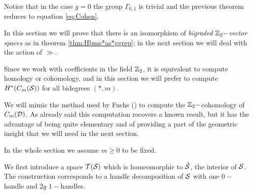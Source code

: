 Notice that in the case $g=0$ the group $\Gamma_{0,1}$ is trivial and the previous theorem
reduces to equation \ref{eq:Cohen}.

In this section we will prove that there is an isomorphism of \emph{bigraded $\Z_2-$vector spaces}
as in theorem \ref{thm:Hbms*as*ggrep}; in the next section we will deal with the action of
$\gg$.

Since we work with coefficients in the field $\Z_2$, it is equivalent to compute homology or cohomology,
and in this section we will prefer to compute $H^*(\cms)$ for all bidegrees $(*,m)$.

We will mimic the method used by Fuchs (\cite{Fuchs:CohomBraidModtwo}) to compute the $\Z_2-$cohomology
of $C_m(\D)$.
As already said this computation recovers a known result, but it has the advantage of
being quite elementary and of providing a part of
the geometric insight that we will need in the next section.

In the whole section we assume $m\geq 0$ to be fixed.

We first introduce a space $\T(\S)$ which is homeomorphic to $\mrS$, the interior of $\S$. The construction
corresponds to a handle decomposition of $\S$ with one $0-$handle and $2g$ $1-$handles.

